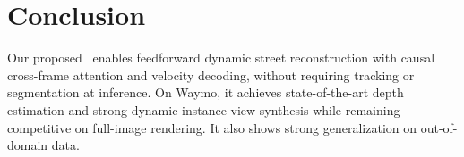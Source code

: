 \section{Conclusion}
Our proposed \StreetForward~enables feedforward dynamic street reconstruction with causal cross-frame attention and velocity decoding, without requiring tracking or segmentation at inference.
On Waymo, it achieves state-of-the-art depth estimation and strong dynamic-instance view synthesis while remaining competitive on full-image rendering.
It also shows strong generalization on out-of-domain data.

